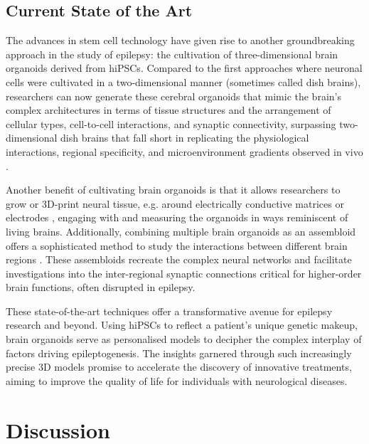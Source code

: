 \documentclass[10pt]{article}
\begin{document}
\begin{sloppypar}
  \subsection{Current State of the Art}
  \label{sec:current-state-of-the-art}

  The advances in stem cell technology have given rise to another groundbreaking approach in the study of epilepsy: the cultivation of three-dimensional brain organoids derived from hiPSCs. Compared to the first approaches where neuronal cells were cultivated in a two-dimensional manner (sometimes called dish brains), researchers can now generate these cerebral organoids that mimic the brain’s complex architectures in terms of tissue structures and the arrangement of cellular types, cell-to-cell interactions, and synaptic connectivity, surpassing two-dimensional dish brains that fall short in replicating the physiological interactions, regional specificity, and microenvironment gradients observed in vivo \citep{clevers_modeling_2016, wang_modeling_2018}.

  Another benefit of cultivating brain organoids is that it allows researchers to grow or 3D-print neural tissue, e.g. around electrically conductive matrices or electrodes \citep{yao_3d_2023}, engaging with and measuring the organoids in ways reminiscent of living brains. Additionally, combining multiple brain organoids as an assembloid offers a sophisticated method to study the interactions between different brain regions \citep{sloan_generation_2018}. These assembloids recreate the complex neural networks and facilitate investigations into the inter-regional synaptic connections critical for higher-order brain functions, often disrupted in epilepsy.

  These state-of-the-art techniques offer a transformative avenue for epilepsy research and beyond. Using hiPSCs to reflect a patient’s unique genetic makeup, brain organoids serve as personalised models to decipher the complex interplay of factors driving epileptogenesis. The insights garnered through such increasingly precise 3D models promise to accelerate the discovery of innovative treatments, aiming to improve the quality of life for individuals with neurological diseases.


  \section{Discussion}
  \label{sec:discussion}



\end{sloppypar}
\end{document}
